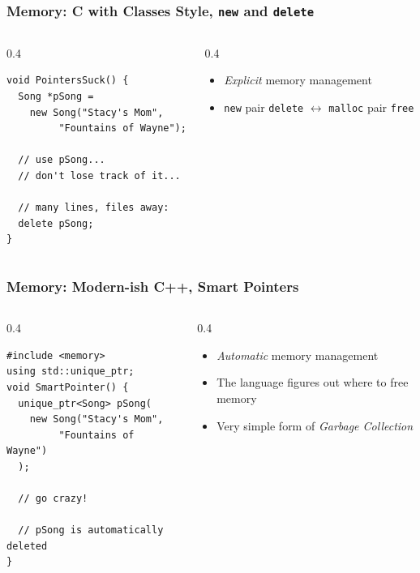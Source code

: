 \documentclass{beamer} \usetheme{Madrid}
\begin{document}
\begin{frame}[fragile]
	\frametitle{Memory: C with Classes Style, \texttt{new} and \texttt{delete}}
	\begin{columns}
		\begin{column}{{0.4\textwidth}}
			\begin{verbatim}
void PointersSuck() {
  Song *pSong =
    new Song("Stacy's Mom",
	     "Fountains of Wayne");

  // use pSong...
  // don't lose track of it...

  // many lines, files away:
  delete pSong;
}
			\end{verbatim}
		\end{column}
		\begin{column}{{0.4\textwidth}}
			\begin{itemize}
				\item \emph{Explicit} memory management
				\item \texttt{new} pair \texttt{delete} \(\leftrightarrow\) \texttt{malloc} pair \texttt{free}
			\end{itemize}
		\end{column}
	\end{columns}
\end{frame}

\begin{frame}[fragile]
	\frametitle{Memory: Modern-ish C++, Smart Pointers}
	\begin{columns}
		\begin{column}{{0.4\textwidth}}
			\begin{verbatim}
#include <memory>
using std::unique_ptr;
void SmartPointer() {
  unique_ptr<Song> pSong(
    new Song("Stacy's Mom",
	     "Fountains of Wayne")
  );

  // go crazy!

  // pSong is automatically deleted
}
			\end{verbatim}
		\end{column}
		\begin{column}{{0.4\textwidth}}
			\begin{itemize}
				\item \emph{Automatic} memory management
				\item The language figures out where to free memory
				\item Very simple form of \emph{Garbage Collection}
			\end{itemize}
		\end{column}
	\end{columns}
\end{frame}
\end{document}
